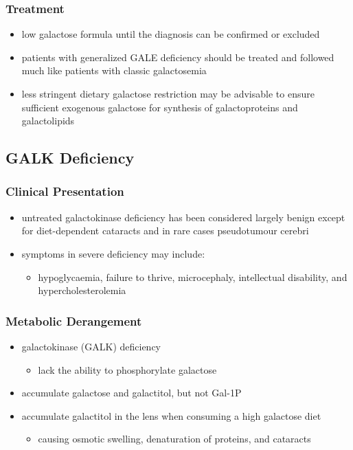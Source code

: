 \documentclass{scrartcl}
\begin{document}
\subsubsection{Treatment}
\label{sec:org6398989}
\begin{itemize}
\item low galactose formula until the diagnosis can be confirmed or excluded
\item patients with generalized GALE deficiency should be treated and
followed much like patients with classic galactosemia
\item less stringent dietary galactose restriction may be advisable to
ensure sufficient exogenous galactose for synthesis of
galactoproteins and galactolipids
\end{itemize}
\subsection{GALK Deficiency}
\label{sec:org9bd6d58}
\subsubsection{Clinical Presentation}
\label{sec:org2d0f4dd}
\begin{itemize}
\item untreated galactokinase deficiency has been considered largely
benign except for diet-dependent cataracts and in rare cases pseudotumour cerebri
\item symptoms in severe deficiency may include:
\begin{itemize}
\item hypoglycaemia, failure to thrive, microcephaly, intellectual
disability, and hypercholesterolemia
\end{itemize}
\end{itemize}

\subsubsection{Metabolic Derangement}
\label{sec:org7e364f9}
\begin{itemize}
\item galactokinase (GALK) deficiency
\begin{itemize}
\item lack the ability to phosphorylate galactose
\end{itemize}
\item accumulate galactose and galactitol, but not Gal-1P
\item accumulate galactitol in the lens when consuming a high galactose diet
\begin{itemize}
\item causing osmotic swelling, denaturation of proteins, and cataracts
\end{itemize}
\end{itemize}
\end{document}

